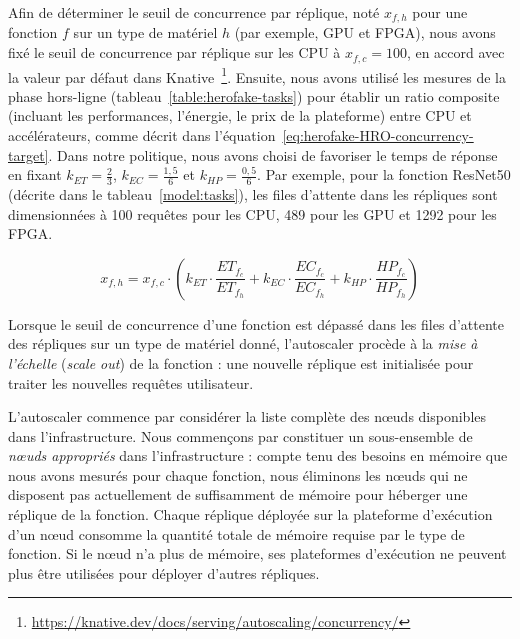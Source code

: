 Afin de déterminer le seuil de concurrence par réplique, noté $x_{f, h}$ pour une fonction $f$ sur un type de matériel $h$ (par exemple, \gls{GPU} et \gls{FPGA}), nous avons fixé le seuil de concurrence par réplique sur les \gls{CPU} à $x_{f, c} = 100$, en accord avec la valeur par défaut dans Knative~\footnote{\href{https://knative.dev/docs/serving/autoscaling/concurrency/}{https://knative.dev/docs/serving/autoscaling/concurrency/}}. Ensuite, nous avons utilisé les mesures de la phase hors-ligne (tableau~\ref{table:herofake-tasks}) pour établir un ratio composite (incluant les performances, l'énergie, le prix de la plateforme) entre \gls{CPU} et accélérateurs, comme décrit dans l'équation~\ref{eq:herofake-HRO-concurrency-target}. Dans notre politique, nous avons choisi de favoriser le temps de réponse en fixant $k_{ET} = \frac{2}{3}$, $k_{EC} = \frac{1,5}{6}$ et $k_{HP} = \frac{0,5}{6}$. Par exemple, pour la fonction ResNet50 (décrite dans le tableau~\ref{model:tasks}), les files d'attente dans les répliques sont dimensionnées à 100 requêtes pour les \gls{CPU}, 489 pour les \gls{GPU} et 1292 pour les \gls{FPGA}.

\begin{equation}
    x_{f, h} = x_{f, c} \cdot (k_{ET} \cdot \frac{ET_{{f}_{c}}}{ET_{{f}_{h}}} + k_{EC} \cdot \frac{EC_{{f}_{c}}}{EC_{{f}_{h}}} + k_{HP} \cdot \frac{HP_{{f}_{c}}}{HP_{{f}_{h}}})
\label{eq:herofake-HRO-concurrency-target}
\end{equation}

Lorsque le seuil de concurrence d'une fonction est dépassé dans les files d'attente des répliques sur un type de matériel donné, l'autoscaler procède à la \textit{mise à l'échelle} (\textit{scale out}) de la fonction : une nouvelle réplique est initialisée pour traiter les nouvelles requêtes utilisateur.

L'autoscaler commence par considérer la liste complète des nœuds disponibles dans l'infrastructure. Nous commençons par constituer un sous-ensemble de \textit{nœuds appropriés} dans l'infrastructure : compte tenu des besoins en mémoire que nous avons mesurés pour chaque fonction, nous éliminons les nœuds qui ne disposent pas actuellement de suffisamment de mémoire pour héberger une réplique de la fonction. Chaque réplique déployée sur la plateforme d'exécution d'un nœud consomme la quantité totale de mémoire requise par le type de fonction. Si le nœud n'a plus de mémoire, ses plateformes d'exécution ne peuvent plus être utilisées pour déployer d'autres répliques.

